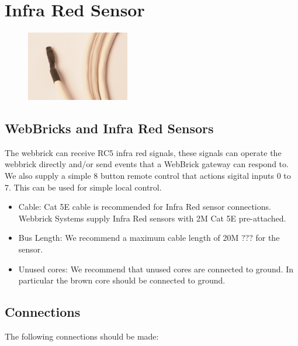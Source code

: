 \section{Infra Red Sensor}

\begin{figure}[H]
\centering
\includegraphics[width=0.4\textwidth]{Images/InfraRedSensorPic.png}
\end{figure}

\subsection{WebBricks and Infra Red Sensors}

The webbrick can receive RC5 infra red signals, these signals can operate the webbrick directly and/or send events that a
WebBrick gateway can respond to. We also supply a simple 8 button remote control that actions sigital inputs 0 to 7. This can be used
for simple local control.


	\begin{itemize}
	  
	  \item{Cable:} Cat 5E cable is recommended for Infra Red sensor connections.  
                    Webbrick Systems supply
	  		Infra Red sensors with 2M Cat 5E pre-attached.
	  		
	  \item{Bus Length:}  We recommend a maximum cable length of 20M ??? for the sensor.
	  			
	  \item{Unused cores:} We recommend that unused cores are connected to ground.  In particular the brown core
	  			should be connected to ground.
	  			
	\end{itemize}

\subsection{Connections}

The following connections should be made:

